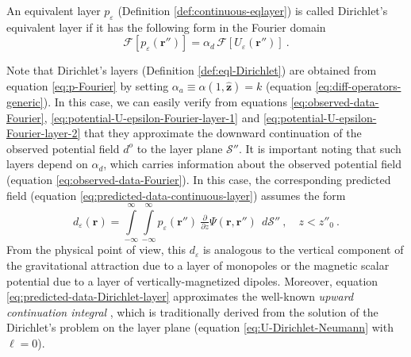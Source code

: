 \begin{definition}
	An equivalent layer $p_{\varepsilon}$ (Definition \ref{def:continuous-eqlayer}) is called Dirichlet's equivalent 
	layer if it has the following form in the Fourier domain
	\begin{equation}
		\mathcal{F} [ p_{\varepsilon}(\mathbf{r}'') ] =
		\alpha_{d} \, \mathcal{F} [ U_{\varepsilon}(\mathbf{r}'') ]  \: .
		\label{eq:p-Fourier-Dirichlet}
	\end{equation}
	\label{def:eql-Dirichlet}
\end{definition}
Note that Dirichlet's layers (Definition \ref{def:eql-Dirichlet}) are obtained from 
equation \ref{eq:p-Fourier} by setting $\alpha_{a} \equiv \alpha(1, \hat{\mathbf{z}}) = k$ 
(equation \ref{eq:diff-operators-generic}).
In this case, we can easily verify from equations \ref{eq:observed-data-Fourier},
\ref{eq:potential-U-epsilon-Fourier-layer-1} and \ref{eq:potential-U-epsilon-Fourier-layer-2} that they 
approximate the downward continuation of the observed potential field $d^{o}$ to the layer plane $\mathcal{S}''$.
It is important noting that such layers depend on $\alpha_{d}$, which 
carries information about the observed potential field (equation \ref{eq:observed-data-Fourier}).
In this case, the corresponding predicted field (equation \ref{eq:predicted-data-continuous-layer}) assumes the form
\begin{equation}
	d_{\varepsilon}(\mathbf{r})
	= \int\limits_{-\infty}^{\infty}\int\limits_{-\infty}^{\infty}
	p_{\varepsilon}(\mathbf{r}'') \: \tfrac{\partial}{\partial z} \Psi(\mathbf{r}, \mathbf{r}'') \:\: d\mathcal{S}''
	\: , \quad z < z''_{0} \: .
	\label{eq:predicted-data-Dirichlet-layer}
\end{equation}
From the physical point of view, this $d_{\varepsilon}$ is analogous
to the vertical component of the gravitational attraction due to a layer of monopoles
or the magnetic scalar potential due to a layer of vertically-magnetized dipoles.
Moreover, equation \ref{eq:predicted-data-Dirichlet-layer} approximates the well-known \textit{upward continuation integral} 
\citep[e.g.,][]{skeels1947, peters1949, henderson-zietz1949, dean1958, roy1962, bhattacharyya1967, henderson1970},
which is traditionally derived from the solution of the Dirichlet’s problem on the
layer plane (equation \ref{eq:U-Dirichlet-Neumann} with $\ell = 0$). 

